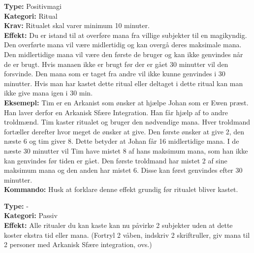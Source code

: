 \begin{sAritMagi*}
\textbf{Type:} Positivmagi\\
\textbf{Kategori:} Ritual\\
\textbf{Krav:} Ritualet skal varer minimum 10 minuter.\\
\textbf{Effekt:}  Du er istand til at overføre mana fra villige subjekter til en magikyndig. Den overførte mana vil være midlertidig og kan overgå deres maksimale mana. Den midlertidige mana vil være den første de bruger og kan ikke genvindes når de er brugt. Hvis manaen ikke er brugt før der er gået 30 minutter vil den forsvinde. Den mana som er taget fra andre vil ikke kunne genvindes i 30 minutter. Hvis man har kastet dette ritual eller deltaget i dette ritual kan man ikke give mana igen i 30 min.\\
\textbf{Eksemepl:} Tim er en Arkanist som ønsker at hjælpe Johan som er Ewen præst. Han laver derfor en Arkanisk Sfære Integration. Han får hjælp af to andre troldmænd. Tim kaster ritualet og bruger den
nødvendige mana. Hver troldmand fortæller derefter hvor meget de ønsker at give. Den første ønsker at give 2, den næste 6 og tim giver 8. Dette betyder at Johan får 16 midlertidige mana. I de næste 30 minutter vil Tim have mistet 8 af hans maksimum mana, som han ikke kan genvindes før tiden er gået. Den første troldmand har mistet 2 af sine maksimum mana og den anden har mistet 6. Disse kan først genvindes efter 30 minutter.\\
\textbf{Kommando:} Husk at forklare denne effekt grundig før ritualet bliver kastet.
\end{sAritMagi*}

\begin{sAritMagi*}
\textbf{Type:} - \\
\textbf{Kategori:} Passiv\\
\textbf{Effekt:}  Alle ritualer du kan kaste kan nu påvirke 2 subjekter uden at dette koster ekstra tid eller mana. (Fortryl 2 våben, indskriv 2 skriftruller, giv mana til 2 personer med Arkanisk Sfære integration, ovs.)
\end{sAritMagi*}
